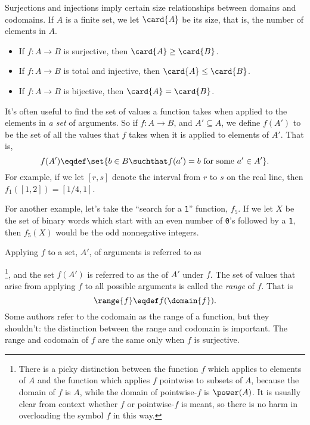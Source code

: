 Surjections and injections imply certain size relationships between
domains and codomains.  If $A$ is a finite set, we let $\card{A}$ be its
size, that is, the number of elements in $A$.

\pagebreak[2]
\begin{lemma*} \mbox{}
\begin{itemize}

\item If $f : A \to B$ is surjective, then $\card{A} \geq \card{B}$.

\item If $f : A \to B$ is total and injective, then $\card{A} \leq \card{B}$.

\item If $f : A \to B$ is bijective, then $\card{A} = \card{B}$.

\end{itemize}
\end{lemma*}

It's often useful to find the set of values a function takes when applied
to the elements in \emph{a set} of arguments.  So if $f:A \to B$, and $A'
\subseteq A$, we define $f(A')$ to be the set of all the values that $f$
takes when it is applied to elements of $A'$.  That is,
\[
f(A') \eqdef \set{b \in B \suchthat f(a') = b \text{ for some } a'
  \in A'}.
\]
For example, if we let $[r,s]$ denote the interval from $r$ to $s$ on the
real line, then $f_1([1,2]) = [1/4,1]$.

For another example, let's take the ``search for a \texttt{1}''
function, $f_5$.  If we let $X$ be the set of binary words which
start with an even number of \texttt{0}'s followed by a
\texttt{1}, then $f_5(X)$ would be the odd nonnegative integers.

Applying $f$ to a set, $A'$, of arguments is referred to as
\footnote{There is a picky distinction between the function $f$ which
  applies to elements of $A$ and the function which applies $f$ pointwise
  to subsets of $A$, because the domain of $f$ is $A$, while the domain of
  pointwise-$f$ is $\power(A)$.  It is usually clear from context whether
  $f$ or pointwise-$f$ is meant, so there is no harm in overloading the
  symbol $f$ in this way.}, and the set $f(A')$ is referred to as the
 of $A'$ under $f$.  The set of values that arise from
applying $f$ to all possible arguments is called the \emph{range} of $f$.
That is
\[
\range{f} \eqdef f(\domain{f}).
\]
Some authors refer to the codomain as the range of a function, but they
shouldn't: the distinction between the range and codomain is important.
The range and codomain of $f$ are the same only when $f$ is surjective.

